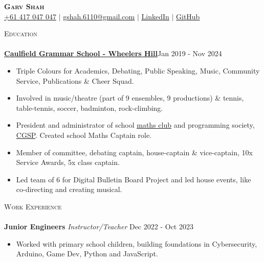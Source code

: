 \documentclass[a4paper]{article}
\newcommand{\lineunder} {
    \vspace*{-8pt} \\
    \hspace*{-10pt} \hrulefill \\
}
\newcommand{\header} [1] {
    {\hspace*{-10pt}\vspace*{6pt} \textsc{#1}}
    \vspace*{-6pt} \lineunder
}
\begin{document}

\begin{center}
    \textbf{\Huge \scshape Garv Shah} \\ \vspace{1pt}
    \small \href{tel:+61417047047}{+61 417 047 047} $|$ \href{mailto:gshah.6110@gmail.com}{gshah.6110@gmail.com} $|$
    \href{https://www.linkedin.com/in/garvshah/}{\ul{LinkedIn}} $|$
    \href{https://garv-shah.github.io/}{\ul{GitHub}}
\end{center}
\vspace{-2mm}

\header{Education}
\href{https://www.caulfieldgs.vic.edu.au/wheelers-hill/}{\textbf{\ul{Caulfield Grammar School - Wheelers Hill}}}\hfill Jan 2019 - Nov 2024\\
\vspace{-2mm}
\begin{itemize} \itemsep 1pt
	\item Triple Colours for Academics, Debating, Public Speaking, Music, Community Service, Publications \& Cheer Squad.
        \item Involved in music/theatre (part of 9 ensembles, 9 productions) \& tennis, table-tennis, soccer, badminton, rock-climbing.
        \item President and administrator of school \href{https://cgs-math.github.io/}{\ul{maths club}} and programming society, \href{https://cgs-programming.github.io}{\ul{CGSP}}.
        Created school Maths Captain role.
        \item Member of committee, debating captain, house-captain \& vice-captain, 10x Service Awards, 5x class captain.
        \item Led team of 6 for Digital Bulletin Board Project and led house events, like co-directing and creating musical.
\end{itemize}
\vspace{-2mm}

\header{Work Experience}

\textbf{Junior Engineers} \textit{Instructor/Teacher} \hfill Dec 2022 - Oct 2023\\
\vspace{-3mm}
\begin{itemize} \itemsep 0.5pt
    \item Worked with primary school children, building foundations in Cybersecurity, Arduino, Game Dev, Python and JavaScript.
\end{itemize}
\vspace{-2mm}
\end{document}
